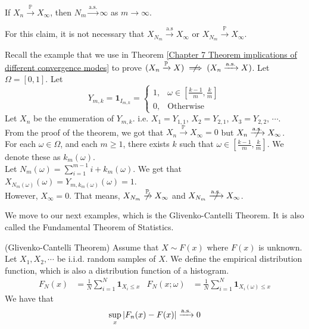 \documentclass{huhtakm-template-book}
\newcommand{\prob}{\mathbb{P}}
\begin{document}
\begin{cla}
	If $X_{n}\xrightarrow{\prob}X_{\infty}$, then $N_{m}\xrightarrow{\text{a.s.}}\infty$ as $m\to\infty$.
\end{cla}
\begin{rem}
	For this claim, it is not necessary that $X_{N_{m}}\xrightarrow{\text{a.s}}X_{\infty}$ or $X_{N_{m}}\xrightarrow{\prob}X_{\infty}$.
\end{rem}
\begin{eg}
	Recall the example that we use in Theorem \ref{Chapter 7 Theorem implications of different convergence modes} to prove $(X_{n}\xrightarrow{\prob}X)\centernot\implies(X_{n}\xrightarrow{\text{a.s.}}X)$. Let $\Omega=[0,1]$. Let
	\begin{equation*}
		Y_{m,k}=\mathbf{1}_{I_{m,k}}=\begin{cases}
			1, &\omega\in\left[\frac{k-1}{m},\frac{k}{m}\right]\\
			0, &\text{Otherwise}
		\end{cases}
	\end{equation*}
	Let $X_{n}$ be the enumeration of $Y_{m,k}$. i.e. $X_{1}=Y_{1,1}$, $X_{2}=Y_{2,1}$, $X_{3}=Y_{2,2}$, $\cdots$.\\
	From the proof of the theorem, we got that $X_{n}\xrightarrow{\prob}X_{\infty}=0$ but $X_{n}\centernot{\xrightarrow{\text{a.s.}}}X_{\infty}$.\\
	For each $\omega\in\Omega$, and each $m\geq 1$, there exists $k$ such that $\omega\in\left[\frac{k-1}{m},\frac{k}{m}\right]$. We denote these as $k_{m}(\omega)$.\\
	Let $N_{m}(\omega)=\sum_{i=1}^{m-1}i+k_{m}(\omega)$. We get that $X_{N_{m}(\omega)}(\omega)=Y_{m,k_{m}(\omega)}(\omega)=1$.\\
	However, $X_{\infty}=0$. That means, $X_{N_{m}}\centernot{\xrightarrow{\prob}}X_{\infty}$ and $X_{N_{m}}\centernot{\xrightarrow{\text{a.s.}}}X_{\infty}$.
\end{eg}
We move to our next examples, which is the Glivenko-Cantelli Theorem. It is also called the Fundamental Theorem of Statistics.
\begin{thm}(Glivenko-Cantelli Theorem)
	Assume that $X\sim F(x)$ where $F(x)$ is unknown. Let $X_{1},X_{2},\cdots$ be i.i.d. random samples of $X$. We define the empirical distribution function, which is also a distribution function of a histogram.
	\begin{align*}
		F_{N}(x)&=\frac{1}{N}\sum_{i=1}^{N}\mathbf{1}_{X_{i}\leq x} & F_{N}(x;\omega)&=\frac{1}{N}\sum_{i=1}^{N}\mathbf{1}_{X_{i}(\omega)\leq x}
	\end{align*}
	We have that
	\begin{equation*}
		\sup_{x}\left|{F_{n}(x)-F(x)}\right|\xrightarrow{\text{a.s.}}0
	\end{equation*}
\end{thm}
\end{document}
